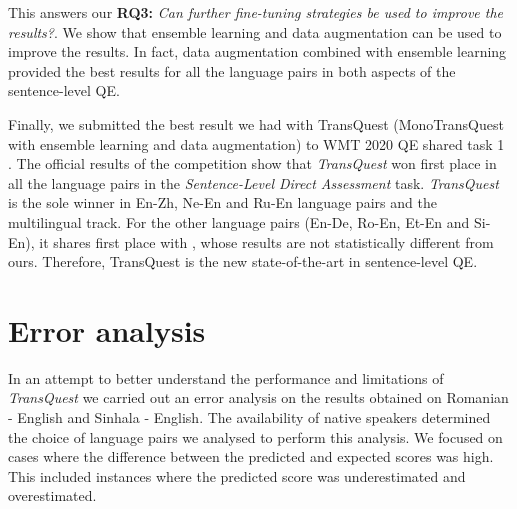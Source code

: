 This answers our \textbf{RQ3:} \textit{Can further fine-tuning strategies be used to improve the results?}. We show that ensemble learning and data augmentation can be used to improve the results. In fact, data augmentation combined with ensemble learning provided the best results for all the language pairs in both aspects of the sentence-level QE. 

Finally, we submitted the best result we had with TransQuest (MonoTransQuest with ensemble learning and data augmentation) to WMT 2020 QE shared task 1 \autocite{specia-etal-2020-findings-wmt}. The official results of the competition show that \textit{TransQuest} won first place in all the language pairs in the \textit{Sentence-Level Direct Assessment} task. \textit{TransQuest} is the sole winner in En-Zh, Ne-En and Ru-En language pairs and the multilingual track. For the other language pairs (En-De, Ro-En, Et-En and Si-En), it shares first place with \autocite{fomicheva-etal-2020-bergamot}, whose results are not statistically different from ours. Therefore, TransQuest is the new state-of-the-art in sentence-level QE.

\section{Error analysis}
\label{sec:transquest_error}

In an attempt to better understand the performance and limitations of \textit{TransQuest} we carried out an error analysis on the results obtained on Romanian - English and Sinhala - English. The availability of native speakers determined the choice of language pairs we analysed to perform this analysis. We focused on cases where the difference between the predicted and expected scores was high. This included instances where the predicted score was underestimated and overestimated.

